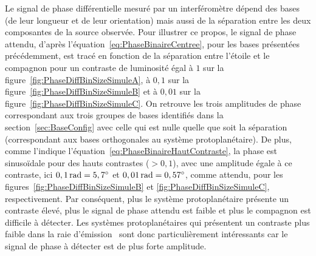 Le signal de phase différentielle mesuré par un interféromètre dépend des bases (de leur longueur et de leur orientation) mais aussi de la séparation entre les deux composantes de la source observée. Pour illustrer ce propos, le signal de phase attendu, d'après l'équation~\ref{eq:PhaseBinaireCentree}, pour les bases présentées précédemment, est tracé en fonction de la séparation entre l'étoile et le compagnon pour un contraste de luminosité égal à $1$ sur la figure~\ref{fig:PhaseDiffBinSizeSimuleA}, à $0,1$ sur la figure~\ref{fig:PhaseDiffBinSizeSimuleB} et à $0,01$ sur la figure~\ref{fig:PhaseDiffBinSizeSimuleC}. On retrouve les trois amplitudes de phase correspondant aux trois groupes de bases identifiés dans la section~\ref{sec:BaseConfig} avec celle qui est nulle quelle que soit la séparation (correspondant aux bases orthogonales au système protoplanétaire). De plus, comme l'indique l'équation~\ref{eq:PhaseBinaireHautContraste}, la phase est sinusoïdale pour des hauts contrastes ($> 0,1$), avec une amplitude égale à ce contraste, ici $0,1 \, \text{rad} = 5,7^{\circ}$ et $0,01 \, \text{rad} = 0,57^{\circ}$, comme attendu, pour les figures~\ref{fig:PhaseDiffBinSizeSimuleB} et \ref{fig:PhaseDiffBinSizeSimuleC}, respectivement. Par conséquent, plus le système protoplanétaire présente un contraste élevé, plus le signal de phase attendu est faible et plus le compagnon est difficile à détecter. Les systèmes protoplanétaires qui présentent un contraste plus faible dans la raie d'émission \ha~sont donc particulièrement intéressants car le signal de phase à détecter est de plus forte amplitude.

